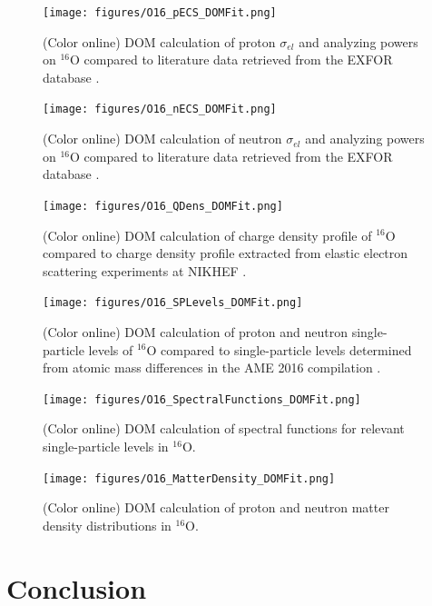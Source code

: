 \documentclass[twocolumn,secnumarabic,amssymb, nobibnotes, aps, prl,
superscriptaddress, nobalancelastpage]{revtex4}
\newcommand{\elasts}{\ensuremath{\sigma_{el}}\,\,}
\begin{document}
\begin{figure}
    \texttt{[image: figures/O16\_pECS\_DOMFit.png]}
    \caption{(Color online) DOM calculation of proton \elasts and analyzing
        powers on $^{16}$O compared to literature data retrieved from the EXFOR
        database \cite{Exfor}.
    }
    \label{O16_pECS_DOMFit}
\end{figure}

\begin{figure}
    \texttt{[image: figures/O16\_nECS\_DOMFit.png]}
    \caption{(Color online) DOM calculation of neutron \elasts and analyzing
        powers on $^{16}$O compared to literature data retrieved from the EXFOR
        database \cite{Exfor}.
    }
    \label{O16_nECS_DOMFit}
\end{figure}

\begin{figure}
    \texttt{[image: figures/O16\_QDens\_DOMFit.png]}
    \caption{(Color online) DOM calculation of charge density profile of $^{16}$O compared to
        charge density profile extracted from elastic electron scattering
        experiments at NIKHEF \cite{DeVries}.
    }
    \label{O16_QDens_DOMFit}
\end{figure}

\begin{figure}
    \texttt{[image: figures/O16\_SPLevels\_DOMFit.png]}
    \caption{(Color online) DOM calculation of proton and neutron single-particle
        levels of $^{16}$O compared to
        single-particle levels determined from atomic mass differences in the
        AME 2016 compilation \cite{AME2016}.
    }
    \label{O16_SPLevels_DOMFit}
\end{figure}

\begin{figure}
    \texttt{[image: figures/O16\_SpectralFunctions\_DOMFit.png]}
    \caption{(Color online) DOM calculation of spectral functions for relevant
    single-particle levels in $^{16}$O.
}
    \label{O16_SpectralFunctions_DOMFit}
\end{figure}

\begin{figure}
    \texttt{[image: figures/O16\_MatterDensity\_DOMFit.png]}
    \caption{(Color online) DOM calculation of proton and neutron matter density
        distributions in $^{16}$O.
    }
    \label{O16_MatterDensity_DOMFit}
\end{figure}

\section{Conclusion}
\end{document}
